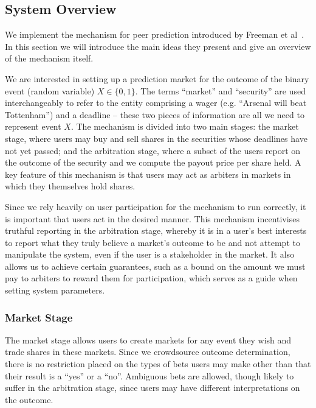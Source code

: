 \subsection{System Overview}

We implement the mechanism for peer prediction introduced by Freeman et
al~\cite{CODiPM}. In this section we will introduce the main ideas they present
and give an overview of the mechanism itself.

We are interested in setting up a prediction market for the outcome of the
binary event (random variable) $X \in \{0,1\}$. The terms ``market'' and
``security'' are used interchangeably to refer to the entity comprising a wager
(e.g. ``Arsenal will beat Tottenham'') and a deadline -- these two pieces of
information are all we need to represent event $X$. The mechanism is divided
into two main stages: the market stage, where users may buy and sell shares in
the securities whose deadlines have not yet passed; and the arbitration stage,
where a subset of the users report on the outcome of the security and we
compute the payout price per share held. A key feature of this mechanism is
that users may act as arbiters in markets in which they themselves hold shares.

Since we rely heavily on user participation for the mechanism to run correctly,
it is important that users act in the desired manner. This mechanism
incentivises truthful reporting in the arbitration stage, whereby it is in a
user's best interests to report what they truly believe a market's outcome to
be and not attempt to manipulate the system, even if the user is a stakeholder
in the market. It also allows us to achieve certain guarantees, such as a bound
on the amount we must pay to arbiters to reward them for participation, which
serves as a guide when setting system parameters.

\subsubsection{Market Stage}

The market stage allows users to create markets for any event they wish and
trade shares in these markets. Since we crowdsource outcome determination,
there is no restriction placed on the types of bets users may make other than
that their result is a ``yes'' or a ``no''. Ambiguous bets are allowed, though
likely to suffer in the arbitration stage, since users may have different
interpretations on the outcome.

